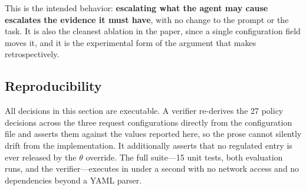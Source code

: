 This is the intended behavior: \textbf{escalating what the agent may cause
escalates the evidence it must have}, with no change to the prompt or the task.
It is also the cleanest ablation in the paper, since a single configuration
field moves it, and it is the experimental form of the argument that
 makes retrospectively.

\subsection{Reproducibility}

All decisions in this section are executable. A verifier re-derives the
27 policy decisions across the three request configurations directly from the
configuration file and asserts them against the values reported here, so the
prose cannot silently drift from the implementation. It additionally asserts
that no regulated entry is ever released by the $\theta$ override. The full
suite---15 unit tests, both evaluation runs, and the verifier---executes in
under a second with no network access and no dependencies beyond a YAML
parser.
